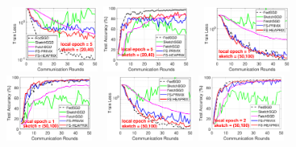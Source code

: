 \documentclass[sigconf, anonymous, review]{acmart}
\begin{document}
\begin{figure}[H]
\begin{center}
				\mbox{\hspace{-0.15in}		
		\includegraphics[width=0.25\textwidth]{MNIST_figures/local5_sketch20_iid0_train_loss.eps} \hspace{-0.12in}
		\includegraphics[width=0.25\textwidth]{MNIST_figures/local5_sketch20_iid0_test_acc.eps}
		}
		\mbox{\hspace{-0.15in}	
		 \includegraphics[width=0.25\textwidth]{MNIST_figures/local1_sketch50_iid0_train_loss.eps} \hspace{-0.12in}
		\includegraphics[width=0.25\textwidth]{MNIST_figures/local1_sketch50_iid0_test_acc.eps} 
		}
		\mbox{\hspace{-0.15in}			   
		\includegraphics[width=0.25\textwidth]{MNIST_figures/local2_sketch50_iid0_train_loss.eps} \hspace{-0.12in}
		\includegraphics[width=0.25\textwidth]{MNIST_figures/local2_sketch50_iid0_test_acc.eps} 
}
\end{center}
\end{figure}
\end{document}
